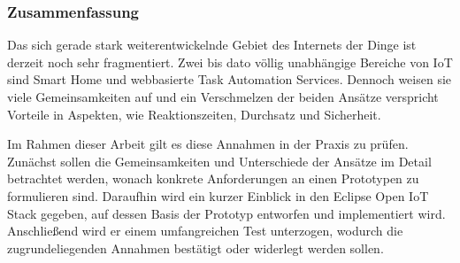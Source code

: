 \null\vfill
\begin{center}
	\subsubsection*{Zusammenfassung}
\end{center}
Das sich gerade stark weiterentwickelnde Gebiet des Internets der Dinge ist derzeit noch sehr fragmentiert. Zwei bis dato völlig unabhängige Bereiche von IoT sind Smart Home und webbasierte Task Automation Services. Dennoch weisen sie viele Gemeinsamkeiten auf und ein Verschmelzen der beiden Ansätze verspricht Vorteile in Aspekten, wie Reaktionszeiten, Durchsatz und Sicherheit.

Im Rahmen dieser Arbeit gilt es diese Annahmen in der Praxis zu prüfen.
Zunächst sollen die Gemeinsamkeiten und Unterschiede der Ansätze im Detail betrachtet werden, wonach konkrete Anforderungen an einen Prototypen zu formulieren sind. 
Daraufhin wird ein kurzer Einblick in den Eclipse Open IoT Stack gegeben, auf dessen Basis der Prototyp entworfen und implementiert wird. 
Anschließend wird er einem umfangreichen Test unterzogen, wodurch die zugrundeliegenden Annahmen bestätigt oder widerlegt werden sollen.



\vfill\null